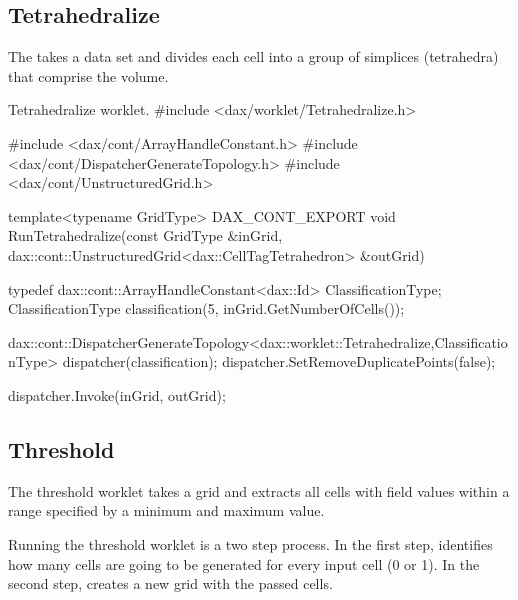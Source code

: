 \subsection{Tetrahedralize}

The  takes a data set and divides each cell into
a group of simplices (tetrahedra) that comprise the volume.


\begin{daxexample}{Tetrahedralize worklet.}
#include <dax/worklet/Tetrahedralize.h>

#include <dax/cont/ArrayHandleConstant.h>
#include <dax/cont/DispatcherGenerateTopology.h>
#include <dax/cont/UnstructuredGrid.h>

template<typename GridType>
DAX_CONT_EXPORT
void RunTetrahedralize(const GridType &inGrid,
                       dax::cont::UnstructuredGrid<dax::CellTagTetrahedron> &outGrid)
{
  typedef dax::cont::ArrayHandleConstant<dax::Id> ClassificationType;
  ClassificationType classification(5, inGrid.GetNumberOfCells());

  dax::cont::DispatcherGenerateTopology<dax::worklet::Tetrahedralize,ClassificationType>
      dispatcher(classification);
  dispatcher.SetRemoveDuplicatePoints(false);

  dispatcher.Invoke(inGrid, outGrid);
}
\end{daxexample}

\subsection{Threshold}

The threshold worklet takes a grid and extracts all cells with field values
within a range specified by a minimum and maximum value.

Running the threshold worklet is a two step process. In the first step,
 identifies how many cells are going to be
generated for every input cell (0 or 1). In the second step,
 creates a new grid with the passed cells.


